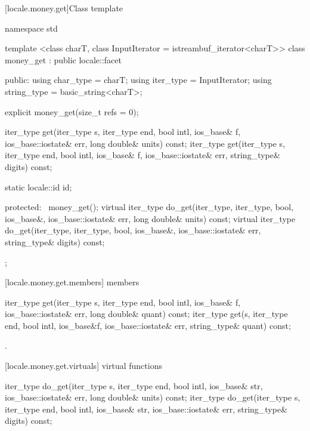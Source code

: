 [locale.money.get]{Class template }

%
\begin{codeblock}
namespace std {
  template <class charT,
    class InputIterator = istreambuf_iterator<charT>>
  class money_get : public locale::facet {
  public:
    using char_type   = charT;
    using iter_type   = InputIterator;
    using string_type = basic_string<charT>;

    explicit money_get(size_t refs = 0);

    iter_type get(iter_type s, iter_type end, bool intl,
                  ios_base& f, ios_base::iostate& err,
                  long double& units) const;
    iter_type get(iter_type s, iter_type end, bool intl,
                  ios_base& f, ios_base::iostate& err,
                  string_type& digits) const;

    static locale::id id;

  protected:
    ~money_get();
    virtual iter_type do_get(iter_type, iter_type, bool, ios_base&,
                             ios_base::iostate& err, long double& units) const;
    virtual iter_type do_get(iter_type, iter_type, bool, ios_base&,
                             ios_base::iostate& err, string_type& digits) const;
  };
}
\end{codeblock}

[locale.money.get.members]{ members}

%
\begin{itemdecl}
iter_type get(iter_type s, iter_type end, bool intl,
              ios_base& f, ios_base::iostate& err,
              long double& quant) const;
iter_type get(s, iter_type end, bool intl, ios_base&f,
              ios_base::iostate& err, string_type& quant) const;
\end{itemdecl}

\begin{itemdescr}
\pnum
\returns
{}.
\end{itemdescr}

[locale.money.get.virtuals]{ virtual functions}

%
\begin{itemdecl}
iter_type do_get(iter_type s, iter_type end, bool intl,
                 ios_base& str, ios_base::iostate& err,
                 long double& units) const;
iter_type do_get(iter_type s, iter_type end, bool intl,
                 ios_base& str, ios_base::iostate& err,
                 string_type& digits) const;
\end{itemdecl}


